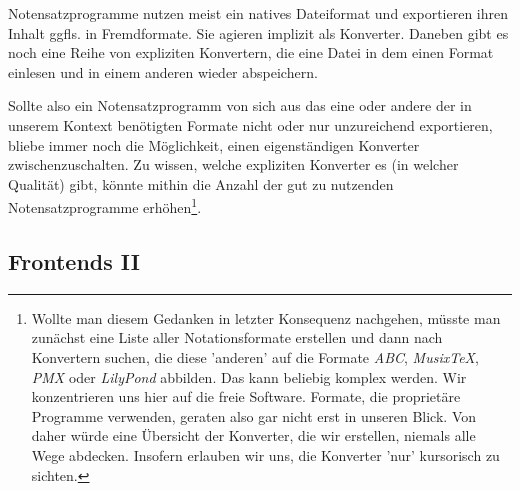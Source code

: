 \documentclass[
  DIV=calc,
  BCOR=5mm,
  11pt,
  headings=small,
  oneside,
  abstract=true,
  toc=bib,
  english,ngerman]{scrartcl}
\begin{document}
Notensatzprogramme nutzen meist ein natives Dateiformat und exportieren ihren
Inhalt ggfls. in Fremdformate. Sie agieren implizit als Konverter. Daneben gibt es
noch eine Reihe von expliziten Konvertern, die eine Datei in dem einen Format
einlesen und in einem anderen wieder abspeichern. 

Sollte also ein Notensatzprogramm von sich aus das eine oder andere der in
unserem Kontext benötigten Formate nicht oder nur unzureichend exportieren,
bliebe immer noch die Möglichkeit, einen eigenständigen Konverter
zwischenzuschalten. Zu wissen, welche expliziten Konverter es (in welcher
Qualität) gibt, könnte mithin die Anzahl der gut zu nutzenden Notensatzprogramme
erhöhen\footnote{Wollte man diesem Gedanken in letzter Konsequenz nachgehen,
müsste man zunächst eine Liste aller Notationsformate erstellen und dann nach
Konvertern suchen, die diese 'anderen' auf die Formate \textit{ABC},
\textit{Musix\TeX}, \textit{PMX} oder \textit{LilyPond} abbilden. Das kann beliebig
komplex werden. Wir konzentrieren uns hier auf die freie Software. Formate, die
proprietäre Programme verwenden, geraten also gar nicht erst in unseren Blick.
Von daher würde eine Übersicht der Konverter, die wir erstellen, niemals alle
Wege abdecken. Insofern erlauben wir uns, die Konverter 'nur' kursorisch zu
sichten.}.








\subsection{Frontends II}

 

 



 

 

 

 

 

 

 

 
\end{document}

